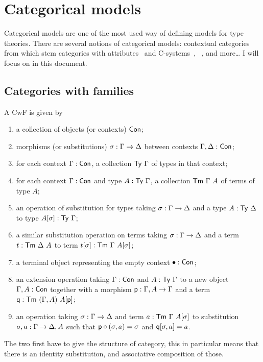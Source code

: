 \section{Categorical models}

Categorical models are one of the most used way of defining models for type
theories. There are several notions of categorical models:
contextual categories~ from which stem
categories with attributes~ and
C-systems~,
~, and more\dots
I will focus on  in this document.

\subsection{Categories with families}

A \acrshort{CwF} is given by
\begin{enumerate}
  \item a collection of objects (or contexts) \(\mathsf{Con}\);
  \item morphisms (or substitutions) \(\sigma : \Gamma \to \Delta\) between contexts
  \(\Gamma, \Delta : \mathsf{Con}\);
  \item for each context \(\Gamma : \mathsf{Con}\), a collection \(\mathsf{Ty}\ \Gamma\) of types in
  that context;
  \item for each context \(\Gamma : \mathsf{Con}\) and type \(A : \mathsf{Ty}\ \Gamma\), a collection
  \(\mathsf{Tm}\ \Gamma\ A\) of terms of type \(A\);
  \item an operation of substitution for types taking \(\sigma : \Gamma \to \Delta\)
  and a type \(A : \mathsf{Ty}\ \Delta\) to type \(A[\sigma] : \mathsf{Ty}\ \Gamma\);
  \item \label{item:term-subst} a similar substitution operation on terms taking
  \(\sigma : \Gamma \to \Delta\) and a term \(t : \mathsf{Tm}\ \Delta\ A\) to term
  \(t[\sigma] : \mathsf{Tm}\ \Gamma\ A[\sigma]\);
  \item a terminal object representing the empty context \(\bullet : \mathsf{Con}\);
  \item an extension operation taking \(\Gamma : \mathsf{Con}\) and \(A : \mathsf{Ty}\ \Gamma\)
  to a new object \(\Gamma, A : \mathsf{Con}\) together with a morphism
  \(\mathsf{p} : \Gamma, A \to \Gamma\) and a term \(\pq : \CTm\ (\Ga, A)\ A[\pp]\);
  \item an operation taking \(\sigma : \Gamma \to \Delta\) and term
  \(a : \CTm\ \Ga\ A[\sigma]\) to substitution \(\sigma, a : \Gamma \to \Delta, A\)
  such that \(\mathsf{p} \circ (\sigma, a) = \sigma\) and \(\mathsf{q}[\sigma, a] = a\).
\end{enumerate}
The two first have to give the structure of category, this in particular means
that there is an identity substitution, and associative composition of those.

